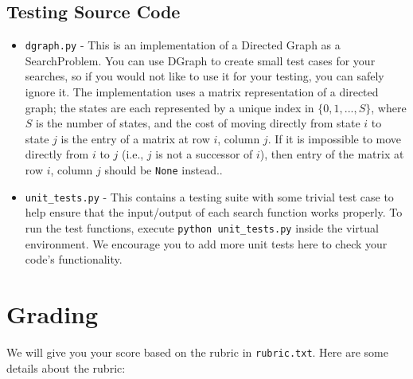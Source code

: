 \documentclass{article}
\begin{document}
\subsection{Testing Source Code}
\begin{itemize}
    \item \verb|dgraph.py| - This is an implementation of a Directed Graph as a SearchProblem.
     You can use DGraph to create small test cases for your searches, so if you would not like to use it for your testing, you can safely ignore it.
    The implementation uses a matrix representation of a directed graph; the states are each represented by a unique index in $\{0, 1, ..., S\}$, where $S$ is the number of states, and the cost of moving directly from state $i$ to state $j$ is the entry of a matrix at row $i$, column $j$.
    If it is impossible to move directly from $i$ to $j$ (i.e., $j$ is not a successor of $i$), then entry of the matrix at row $i$, column $j$ should be \verb|None| instead..

    \item\verb|unit_tests.py| - This contains a testing suite with some trivial test case to help ensure that the input/output of each search function works properly. To run the test functions, execute \verb|python unit_tests.py| inside the virtual environment. We encourage you to add more unit tests here to check your code's functionality.

\end{itemize}

\section{Grading}

We will give you your score based on the rubric in \verb|rubric.txt|.
Here are some details about the rubric:
\end{document}
